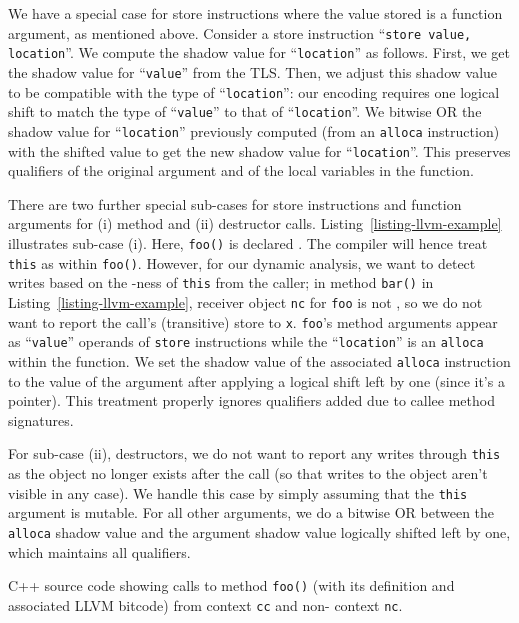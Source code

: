 We have a special case for store instructions where the value stored is a
function argument, as mentioned above.
Consider a store instruction ``\texttt{store value, location}''.
We compute the shadow value for ``\texttt{location}'' as follows.
First, we get the shadow value for ``\texttt{value}'' from the TLS.
Then, we adjust this shadow value to be compatible with the type of
``\texttt{location}'': our encoding requires one logical shift to match the type
of ``\texttt{value}'' to that of ``\texttt{location}''.
We bitwise OR the shadow value for ``\texttt{location}'' previously computed
(from an \texttt{alloca} instruction) with the shifted value to get the new
shadow value for ``\texttt{location}''.
This preserves \const{} qualifiers of the original argument and of the local
variables in the function.

There are two further special sub-cases for store instructions and function
arguments for (i) method and (ii) destructor calls.
Listing~\ref{listing-llvm-example} illustrates sub-case (i).
Here, \texttt{foo()} is declared \const{}.
The compiler will hence treat \texttt{this} as \const{} within \texttt{foo()}.
However, for our dynamic analysis, we want to detect writes based on the
\const{}-ness of \texttt{this} from the caller; in method \texttt{bar()} in
Listing~\ref{listing-llvm-example}, receiver object \texttt{nc} for
\texttt{foo} is not \const{}, so we do not want to report the call's (transitive) store
to \texttt{x}.
\texttt{foo}'s method arguments appear as ``\texttt{value}'' operands of
\texttt{store} instructions while the ``\texttt{location}'' is an
\texttt{alloca} within the function.
We set the shadow value of the associated \texttt{alloca} instruction to the
value of the argument after applying a logical shift left by one (since it's a
pointer).
This treatment properly ignores \const{} qualifiers added due to callee
method signatures.

For sub-case (ii), destructors, we do not want to report any writes through
\texttt{this} as the object no longer exists after the call (so that writes to
the object aren't visible in any case).
We handle this case by simply assuming that the \texttt{this} argument is
mutable.
For all other arguments, we do a bitwise OR between the \texttt{alloca} shadow
value and the argument shadow value logically shifted left by one, which
maintains all \const{} qualifiers.

\begin{listing}[ht]
  \caption{C++ source code showing calls to method \texttt{foo()} (with
           its definition and associated LLVM bitcode) from \const{} context
           \texttt{cc} and non-\const{} context \texttt{nc}.}
  \label{listing-llvm-example}
  \centering
  
\end{listing}

